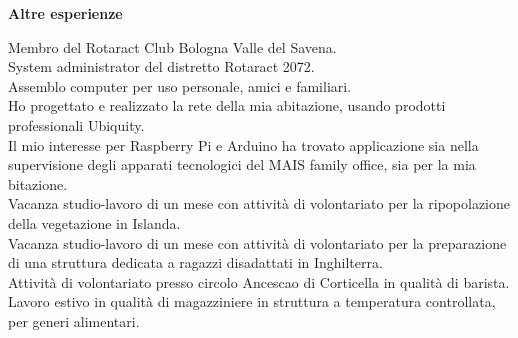 \documentclass[a4paper,12pt,final]{memoir}
\newcommand{\Sep}{\vspace{1.5em}}
\newcommand{\SmallSep}{\vspace{0.5em}}
\newcommand{\CVSection}[1]
	{\Large\textbf{#1}\par
	\SmallSep\normalsize\normalfont}
\begin{document}
\CVSection{Altre esperienze}
	Membro del Rotaract Club Bologna Valle del Savena.
	\\System administrator del distretto Rotaract 2072.
	\\Assemblo computer per uso personale, amici e familiari.
	\\Ho progettato e realizzato la rete della mia abitazione, usando prodotti professionali Ubiquity.
	\\Il mio interesse per Raspberry Pi e Arduino ha trovato applicazione sia nella supervisione degli apparati tecnologici del MAIS family office, sia per la mia bitazione.
	\\Vacanza studio-lavoro di un mese con attività di volontariato per la ripopolazione della vegetazione in Islanda.
	\\Vacanza studio-lavoro di un mese con attività di volontariato per la preparazione di una struttura dedicata a ragazzi disadattati in Inghilterra.
	\\Attività di volontariato presso circolo Ancescao di Corticella in qualità di barista.
	\\Lavoro estivo in qualità di magazziniere in struttura a temperatura controllata, per generi alimentari.
\Sep


\end{document}
